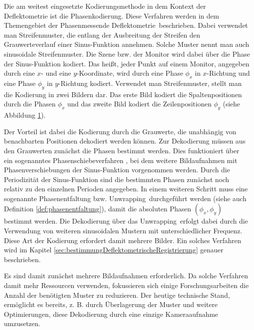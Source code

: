 Die am weitest eingesetzte Kodierungsmethode in dem Kontext der Deflektometrie ist die Phasenkodierung.
Diese Verfahren werden in dem Themengebiet der \glqq Phasenmessende Deflektometrie\grqq ~beschrieben.
Dabei verwendet man Streifenmuster, die entlang der Ausbreitung der Streifen den Grauwerteverlauf einer Sinus-Funktion annehmen.
Solche Muster nennt man auch sinusoidale Streifenmuster.
Die Szene bzw. der Monitor wird dabei über die Phase der Sinus-Funktion kodiert.
Das heißt, jeder Punkt auf einem Monitor, angegeben durch eine $x$- und eine $y$-Koordinate, wird durch eine Phase $\phi_x$ in $x$-Richtung und eine Phase $\phi_y$ in $y$-Richtung kodiert.
Verwendet man Streifenmuster, stellt man die Kodierung in zwei Bildern dar.
Das erste Bild kodiert die Spaltenpositionen durch die Phasen $\phi_x$ und das zweite Bild kodiert die Zeilenpositionen $\phi_y$ (siehe Abbildung \ref{tikz:abbSinusoidaleStreifenmuster}).

\begin{figure}[H]
	\centering
		
		\label{tikz:abbSinusoidaleStreifenmuster}
\end{figure}

\noindent
Der Vorteil ist dabei die Kodierung durch die Grauwerte, die unabhängig von benachbarten Positionen dekodiert werden können.
Zur Dekodierung müssen aus den Grauwerten zunächst die Phasen bestimmt werden.
Dies funktioniert über ein sogenanntes Phasenschiebeverfahren \cite{carre}, bei dem weitere Bildaufnahmen mit Phasenverschiebungen der Sinus-Funktion vorgenommen werden.
Durch die Periodizität der Sinus-Funktion sind die bestimmten Phasen zunächst noch relativ zu den einzelnen Perioden angegeben.
In einem weiteren Schritt muss eine sogenannte Phasenentfaltung bzw. \glqq Unwrapping\grqq ~durchgeführt werden (siehe auch Definition \ref{def:phasenentfaltung}), damit die absoluten Phasen $\left(\phi_x,\phi_y\right)$ bestimmt werden.
Die Dekodierung über das \glqq Unwrapping\grqq ~erfolgt dabei durch die Verwendung von weiteren sinusoidalen Mustern mit unterschiedlicher Frequenz.
Diese Art der Kodierung erfordert damit mehrere Bilder.
Ein solches Verfahren wird im Kapitel \ref{sec:bestimmungDeflektometrischeRegistrierung} genauer beschrieben.

\p
Es sind damit zunächst mehrere Bildaufnahmen erforderlich.
Da solche Verfahren damit mehr Ressourcen verwenden, fokussieren sich einige Forschungsarbeiten die Anzahl der benötigten Muster zu reduzieren.
Der heutige technische Stand, ermöglicht es bereits, z. B. durch Überlagerung der Muster und weitere Optimierungen, diese Dekodierung durch eine einzige Kameraaufnahme umzusetzen.